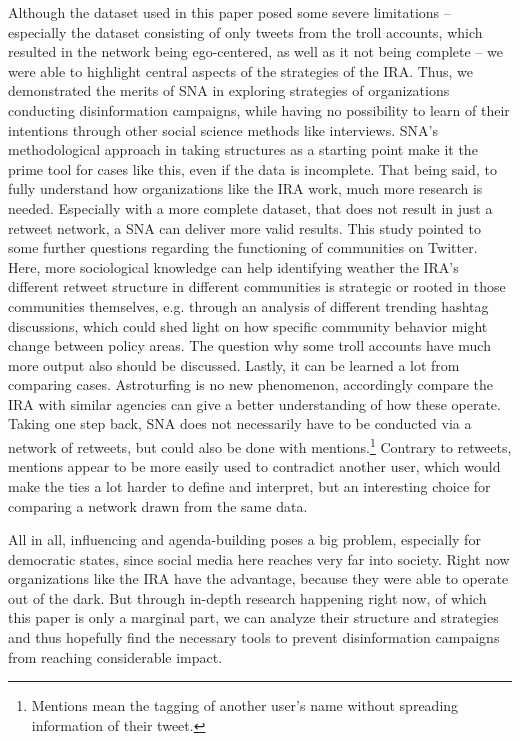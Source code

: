 \documentclass[12pt, titlepage=true, toc=bib]{scrartcl}
\begin{document}
Although the dataset used in this paper posed some severe limitations -- especially the dataset consisting of only tweets from the troll accounts, which resulted in the network being ego-centered, as well as it not being complete -- we were able to highlight central aspects of the strategies of the IRA. Thus, we demonstrated the merits of SNA in exploring strategies of organizations conducting disinformation campaigns, while having no possibility to learn of their intentions through other social science methods like interviews. SNA's methodological approach in taking structures as a starting point make it the prime tool for cases like this, even if the data is incomplete. That being said, to fully understand how organizations like the IRA work, much more research is needed. Especially with a more complete dataset, that does not result in just a retweet network, a SNA can deliver more valid results. This study pointed to some further questions regarding the functioning of communities on Twitter. Here, more sociological knowledge can help identifying weather the IRA's different retweet structure in different communities is strategic or rooted in those communities themselves, e.g. through an analysis of different trending hashtag discussions, which could shed light on how specific community behavior might change between policy areas. The question why some troll accounts have much more output also should be discussed. Lastly, it can be learned a lot from comparing cases. Astroturfing is no new phenomenon, accordingly compare the IRA with similar agencies can give a better understanding of how these operate. Taking one step back, SNA does not necessarily have to be conducted via a network of retweets, but could also be done with mentions.\footnote{Mentions mean the tagging of another user's name without spreading information of their tweet.} Contrary to retweets, mentions appear to be more easily used to contradict another user, which would make the ties a lot harder to define and interpret, but an interesting choice for comparing a network drawn from the same data.

All in all, influencing and agenda-building poses a big problem, especially for democratic states, since social media here reaches very far into society. Right now organizations like the IRA have the advantage, because they were able to operate out of the dark. But through in-depth research happening right now, of which this paper is only a marginal part, we can analyze their structure and strategies and thus hopefully find the necessary tools to prevent disinformation campaigns from reaching considerable impact.


\newpage

\printbibliography
\end{document}
